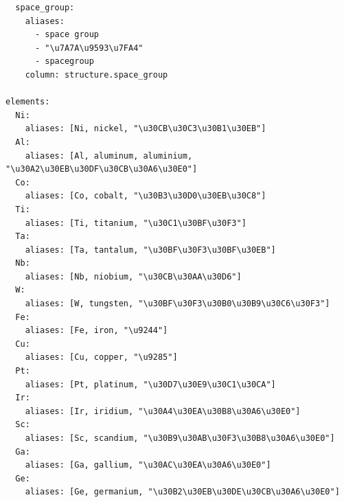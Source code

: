 \documentclass[3p]{elsarticle}
\begin{document}
\begin{lstlisting}
  space_group:
    aliases:
      - space group
      - "\u7A7A\u9593\u7FA4"
      - spacegroup
    column: structure.space_group

elements:
  Ni:
    aliases: [Ni, nickel, "\u30CB\u30C3\u30B1\u30EB"]
  Al:
    aliases: [Al, aluminum, aluminium, "\u30A2\u30EB\u30DF\u30CB\u30A6\u30E0"]
  Co:
    aliases: [Co, cobalt, "\u30B3\u30D0\u30EB\u30C8"]
  Ti:
    aliases: [Ti, titanium, "\u30C1\u30BF\u30F3"]
  Ta:
    aliases: [Ta, tantalum, "\u30BF\u30F3\u30BF\u30EB"]
  Nb:
    aliases: [Nb, niobium, "\u30CB\u30AA\u30D6"]
  W:
    aliases: [W, tungsten, "\u30BF\u30F3\u30B0\u30B9\u30C6\u30F3"]
  Fe:
    aliases: [Fe, iron, "\u9244"]
  Cu:
    aliases: [Cu, copper, "\u9285"]
  Pt:
    aliases: [Pt, platinum, "\u30D7\u30E9\u30C1\u30CA"]
  Ir:
    aliases: [Ir, iridium, "\u30A4\u30EA\u30B8\u30A6\u30E0"]
  Sc:
    aliases: [Sc, scandium, "\u30B9\u30AB\u30F3\u30B8\u30A6\u30E0"]
  Ga:
    aliases: [Ga, gallium, "\u30AC\u30EA\u30A6\u30E0"]
  Ge:
    aliases: [Ge, germanium, "\u30B2\u30EB\u30DE\u30CB\u30A6\u30E0"]

\end{lstlisting}
\end{document}
